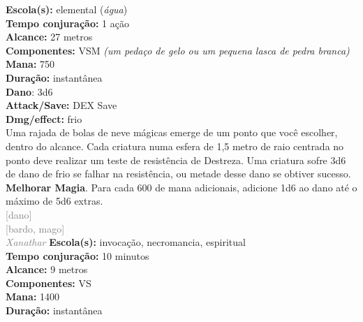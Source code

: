 \documentclass{RPG_Adventure}[2021/10/20]
\begin{document}
{\small \t \textbf{Escola(s):} elemental (\textit{água})\\\t \textbf{Tempo conjuração:} 1 ação\\\t \textbf{Alcance:} 27 metros\\\t \textbf{Componentes:} VSM \textit{(um pedaço de gelo ou um pequena lasca de pedra branca)}\\\t \textbf{Mana:} 750\\\t \textbf{Duração:} instantânea\\\t \textbf{Dano}: 3d6\\\t \textbf{Attack/Save:} DEX Save\\\t \textbf{Dmg/effect:} frio\\}
{\normalsize Uma rajada de bolas de neve mágicas emerge de um ponto que você escolher, dentro do alcance. Cada criatura numa esfera de 1,5 metro de raio centrada no ponto deve realizar um teste de resistência de Destreza. Uma criatura sofre 3d6 de dano de frio se falhar na resistência, ou metade desse dano se obtiver sucesso.\\\t \textbf{Melhorar Magia}. Para cada 600 de mana adicionais, adicione 1d6 ao dano até o máximo de 5d6 extras.\\}
{\scriptsize \textcolor{gray}{[dano]\\}}
{\scriptsize \textcolor{gray}{[bardo, mago]\\}}
{\tiny \textcolor{gray}{\textit{Xanathar}}}
{\small \t \textbf{Escola(s):} invocação, necromancia, espiritual\\\t \textbf{Tempo conjuração:} 10 minutos\\\t \textbf{Alcance:} 9 metros\\\t \textbf{Componentes:} VS\\\t \textbf{Mana:} 1400\\\t \textbf{Duração:} instantânea\\}
\end{document}
